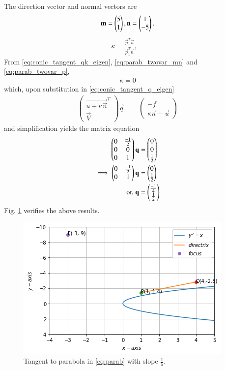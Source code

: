 \documentclass[journal,12pt,twocolumn]{IEEEtran}
\begin{document}
The direction vector and normal vectors are
\begin{align}
\mathbf{m} = \begin{pmatrix}5\\1\end{pmatrix}, \mathbf{n} = \begin{pmatrix}1\\-5\end{pmatrix}.
\label{eq:parab_twovar_mn}
\end{align}
\begin{align}
\label{eq:conic_tangent_qk_eigen} \kappa = \frac{\vec{p}_1^T\vec{u}}{\vec{p}_1^T\vec{n}}, \quad 
\end{align}
From \eqref{eq:conic_tangent_qk_eigen}, \eqref{eq:parab_twovar_mn} and \eqref{eq:parab_twovar_p},
\begin{align}
\kappa = 0
\end{align}
which, upon substitution in  \eqref{eq:conic_tangent_q_eigen}
\begin{align}
\label{eq:conic_tangent_q_eigen}
\begin{pmatrix}
\vec{u+\kappa \vec{n}}^T \\ \vec{V}
\end{pmatrix}
\vec{q} &= 
\begin{pmatrix}
-f
\\
\kappa\vec{n}-\vec{u}
\end{pmatrix}
\end{align}
and simplification yields the matrix equation
\begin{align}
\begin{pmatrix}0 & \frac{-1}{2}\\0 & 0\\0&1\end{pmatrix}\mathbf{q} &= \begin{pmatrix}0\\0\\\frac{1}{2}\end{pmatrix}
\\
\implies \begin{pmatrix}0 & \frac{-1}{2}\\0&1\end{pmatrix}\mathbf{q} &= \begin{pmatrix}0\\\frac{1}{2}\end{pmatrix}
\\
\text{or, } \mathbf{q} &= \begin{pmatrix}\frac{-1}{4}\\\frac{1}{2}\end{pmatrix}
\end{align}
Fig. \ref{fig:parab_tangent}	verifies the above results.
%
\begin{figure}[!ht]
\centering
\includegraphics[width=\columnwidth]{download.png}
\caption{Tangent to  parabola in \eqref{eq:parab}  with slope $\frac{1}{5}$. }
\label{fig:parab_tangent}	
\end{figure}
\end{document}
